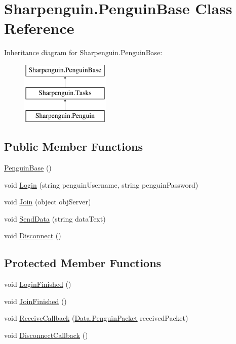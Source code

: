 \hypertarget{classSharpenguin_1_1PenguinBase}{\section{Sharpenguin.\-Penguin\-Base Class Reference}
\label{classSharpenguin_1_1PenguinBase}
}
Inheritance diagram for Sharpenguin.\-Penguin\-Base\-:\begin{figure}[H]
\begin{center}
\leavevmode
\includegraphics[height=3.000000cm]{classSharpenguin_1_1PenguinBase}
\end{center}
\end{figure}
\subsection*{Public Member Functions}
\begin{DoxyCompactItemize}
\item 
\hyperlink{classSharpenguin_1_1PenguinBase_abae69c0be10d8de6f6f852a5a9820c44}{Penguin\-Base} ()
\item 
void \hyperlink{classSharpenguin_1_1PenguinBase_a5447c51dc7c4f75091e9330e53f11213}{Login} (string penguin\-Username, string penguin\-Password)
\item 
void \hyperlink{classSharpenguin_1_1PenguinBase_ae883a098b18a513c9ca47e80d833c32e}{Join} (object obj\-Server)
\item 
void \hyperlink{classSharpenguin_1_1PenguinBase_a264ccadc06dccb3ad1812e6ce3ac5a44}{Send\-Data} (string data\-Text)
\item 
void \hyperlink{classSharpenguin_1_1PenguinBase_a1c56da96688962cc6db870fad34b9e62}{Disconnect} ()
\end{DoxyCompactItemize}
\subsection*{Protected Member Functions}
\begin{DoxyCompactItemize}
\item 
void \hyperlink{classSharpenguin_1_1PenguinBase_aa6a126810f26f0b1d85b8c6e35eed5c9}{Login\-Finished} ()
\item 
void \hyperlink{classSharpenguin_1_1PenguinBase_a64a4a3cd550fd49156f9ed5fbd1836ed}{Join\-Finished} ()
\item 
void \hyperlink{classSharpenguin_1_1PenguinBase_a0d866e6fe167c36721fc282cb36d9d07}{Receive\-Callback} (\hyperlink{classSharpenguin_1_1Data_1_1PenguinPacket}{Data.\-Penguin\-Packet} received\-Packet)
\item 
void \hyperlink{classSharpenguin_1_1PenguinBase_a06facd0f0f753fa79596ae31a6811a86}{Disconnect\-Callback} ()
\end{DoxyCompactItemize}

